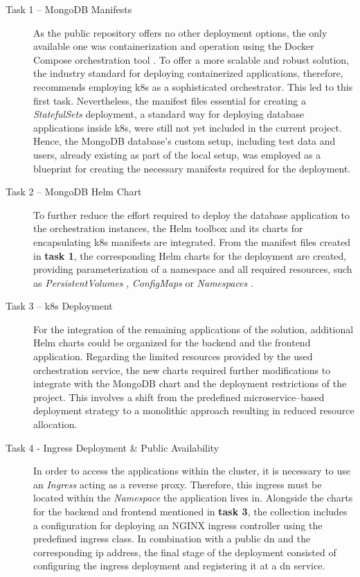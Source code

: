 \begin{description}
    \item[Task 1 -- MongoDB Manifests] As the public repository offers no other deployment options, the only available one was containerization and operation using the Docker Compose orchestration tool \cite{noauthor_overview_2023}. 
    To offer a more scalable and robust solution, the industry standard for deploying containerized applications, therefore, recommends employing \acrfull{k8s} \cite{noauthor_produktionsreife_nodate} as a sophisticated orchestrator. This led to this first task. 
    Nevertheless, the manifest files essential for creating a \textit{StatefulSets} \cite{noauthor_statefulsets_nodate} deployment, a standard way for deploying database applications inside \acrshort{k8s}, were still not yet included in the current project. 
    Hence, the MongoDB \cite{noauthor_mongodb_nodate} database's custom setup, including test data and users, already existing as part of the local setup, was employed as a blueprint for creating the necessary manifests required for the deployment.
    \item[Task 2 -- MongoDB Helm Chart] To further reduce the effort required to deploy the database application to the orchestration instances, the Helm \cite{noauthor_helm_nodate} toolbox and its charts for encapsulating \acrshort{k8s} manifests are integrated.  
    From the manifest files created in \textbf{task 1}, the corresponding Helm charts for the deployment are created, providing parameterization of a namespace and all required resources, such as \textit{PersistentVolumes} \cite{noauthor_persistent_nodate}, \textit{ConfigMaps} \cite{noauthor_configmaps_nodate} or \textit{Namespaces} \cite{noauthor_namespaces_nodate}. 
    \item[Task 3 -- \acrshort{k8s} Deployment] For the integration of the remaining applications of the solution, additional Helm charts could be organized for the backend and the frontend application. 
    Regarding the limited resources provided by the used orchestration service, the new charts required further modifications to integrate with the MongoDB chart and the deployment restrictions of the project. This involves a shift from the predefined microservice--based deployment strategy to a monolithic approach resulting in reduced resource allocation.
    \item[Task 4 - Ingress Deployment \& Public Availability] In order to access the applications within the cluster, it is necessary to use an \textit{Ingress} \cite{noauthor_ingress_nodate} acting as a reverse proxy. 
    Therefore, this ingress must be located within the \textit{Namespace} the application lives in.
    Alongside the charts for the backend and frontend mentioned in \textbf{task 3}, the collection includes a configuration for deploying an NGINX ingress controller \cite{noauthor_nginx_nodate} using the predefined ingress class. 
    In combination with a public \acrshort{dn} and the corresponding \acrshort{ip} address, the final stage of the deployment consisted of configuring the ingress deployment and registering it at a \acrshort{dn} service.
\end{description}

